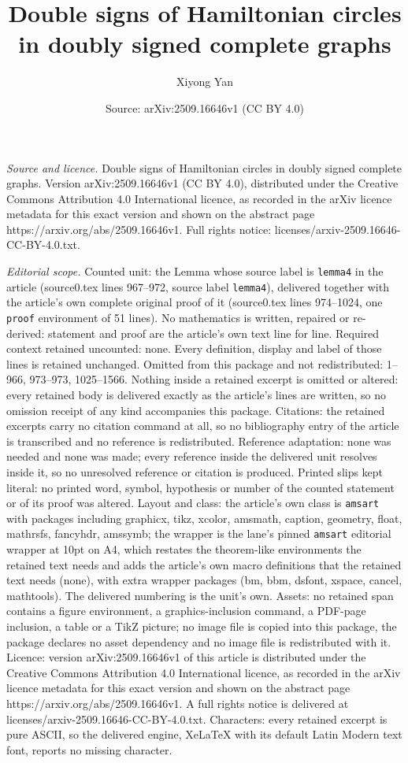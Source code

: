 \documentclass[10pt,a4paper]{amsart}
\title[Double signs of Hamiltonian circles in doubly signed complet]{Double signs of Hamiltonian circles in doubly signed complete graphs}
\author{Xiyong Yan}
\date{Source: arXiv:2509.16646v1 (CC BY 4.0)}
\begin{document}
\maketitle

\noindent\emph{Source and licence.} Double signs of Hamiltonian circles in doubly signed complete graphs. Version arXiv:2509.16646v1 (CC BY 4.0), distributed under the Creative Commons Attribution 4.0 International licence, as recorded in the arXiv licence metadata for this exact version and shown on the abstract page https://arxiv.org/abs/2509.16646v1. Full rights notice: licenses/arxiv-2509.16646-CC-BY-4.0.txt.\par\smallskip

\noindent\textit{Editorial scope.} Counted unit: the Lemma whose source label is \texttt{lemma4} in the article (source0.tex lines 967--972, source label \texttt{lemma4}), delivered together with the article's own complete original proof of it (source0.tex lines 974--1024, one \texttt{proof} environment of 51 lines). No mathematics is written, repaired or re-derived: statement and proof are the article's own text line for line. Required context retained uncounted: none. Every definition, display and label of those lines is retained unchanged. Omitted from this package and not redistributed: 1--966, 973--973, 1025--1566. Nothing inside a retained excerpt is omitted or altered: every retained body is delivered exactly as the article's lines are written, so no omission receipt of any kind accompanies this package. Citations: the retained excerpts carry no citation command at all, so no bibliography entry of the article is transcribed and no reference is redistributed. Reference adaptation: none was needed and none was made; every reference inside the delivered unit resolves inside it, so no unresolved reference or citation is produced. Printed slips kept literal: no printed word, symbol, hypothesis or number of the counted statement or of its proof was altered. Layout and class: the article's own class is \texttt{amsart} with packages including graphicx, tikz, xcolor, amsmath, caption, geometry, float, mathrsfs, fancyhdr, amssymb; the wrapper is the lane's pinned \texttt{amsart} editorial wrapper at 10pt on A4, which restates the theorem-like environments the retained text needs and adds the article's own macro definitions that the retained text needs (none), with extra wrapper packages (bm, bbm, dsfont, xspace, cancel, mathtools). The delivered numbering is the unit's own. Assets: no retained span contains a figure environment, a graphics-inclusion command, a PDF-page inclusion, a table or a TikZ picture; no image file is copied into this package, the package declares no asset dependency and no image file is redistributed with it. Licence: version arXiv:2509.16646v1 of this article is distributed under the Creative Commons Attribution 4.0 International licence, as recorded in the arXiv licence metadata for this exact version and shown on the abstract page https://arxiv.org/abs/2509.16646v1. A full rights notice is delivered at licenses/arxiv-2509.16646-CC-BY-4.0.txt. Characters: every retained excerpt is pure ASCII, so the delivered engine, XeLaTeX with its default Latin Modern text font, reports no missing character.
\end{document}
